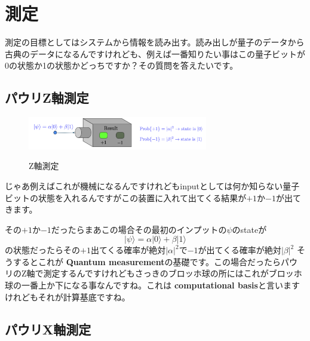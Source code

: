 \section{測定}
測定の目標としてはシステムから情報を読み出す。読み出しが量子のデータから古典のデータになるんですけれども、例えば一番知りたい事はこの量子ビットが0の状態か1の状態かどっちですか？その質問を答えたいです。
\subsection{パウリZ軸測定}
\begin{figure}[H]
    \centering
    \includegraphics[width=0.7\textwidth]{lesson2/Pauli_z_machine.pdf}
    \label{fig: 1}
    \begin{center}
        \caption{Z軸測定}
    \end{center}
\end{figure}
じゃあ例えばこれが機械になるんですけれどもinputとしては何か知らない量子ビットの状態を入れるんですがこの装置に入れて出てくる結果が$+1$か$-1$が出てきます。

その$+1$か$-1$だったらまあこの場合その最初のインプットの$\psi$のstateが
\begin{equation}
|\psi\rangle=\alpha|0\rangle+\beta|1\rangle
\end{equation}
の状態だったらその$+1$出てくる確率が絶対$|\alpha|^{2}$で$-1$が出てくる確率が絶対$|\beta|^{2}$
そうするとこれが \textbf{Quantum measurement}の基礎です。この場合だったらパウリのZ軸で測定するんですけれどもさっきのブロッホ球の所にはこれがブロッホ球の一番上か下になる事なんですね。これは \textbf{computational basis}と言いますけれどもそれが計算基底ですね。
\subsection{パウリX軸測定}

